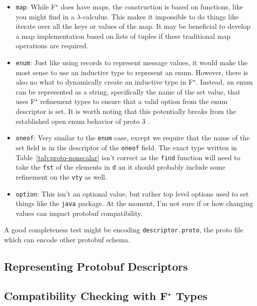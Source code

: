 \documentclass[11pt]{article}
\theoremstyle{definition}
\theoremstyle{plain}
\newcommand{\fstar}{F$^\star$}
\begin{document}
\begin{itemize}
	\item \texttt{map}: While \fstar{} does have maps, the construction is based
      on functions, like you might find in a $\lambda$-calculus. This makes it
      impossible to do things like iterate over all the keys or values of the
      map. It may be beneficial to develop a map implementation based on lists
      of tuples if these traditional map operations are required.
    \item \texttt{enum}: Just like using records to represent message values, it
      would make the most sense to use an inductive type to represent an
      enum. However, there is also no what to dynamically create an inductive
      type in \fstar{}. Instead, an enum can be represented as a string,
      specifically the name of the set value, that uses \fstar{} refinement
      types to ensure that a valid option from the enum descriptor is set. It is
      worth noting that this potentially breaks from the established open enum
      behavior of proto 3 \cite{EnumBehavior}.
    \item \texttt{oneof}: Very similar to the \texttt{enum} case, except we
      require that the name of the set field is in the descriptor of the
      \texttt{oneof} field. The exact type written in
      Table~\ref{tab:proto-nonscalar} isn't correct as the \texttt{find}
      function will need to take the \texttt{fst} of the elements in \texttt{d}
      an it should probably include some refinement on the \texttt{vty} as well.
	\item \texttt{option}: This isn't an optional value, but rather top level
      options used to set things like the \texttt{java} package. At the moment,
      I'm not sure if or how changing values can impact protobuf compatibility.
\end{itemize}

A good completeness test might be encoding \texttt{descriptor.proto}, the proto
file which can encode other protobuf schema.

\subsection{Representing Protobuf Descriptors}

\subsection{Compatibility Checking with \fstar{} Types}
\end{document}
